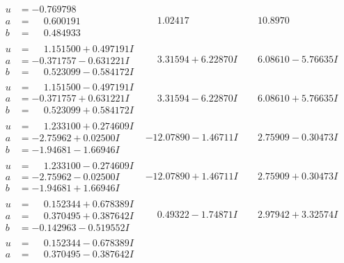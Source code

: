 \documentclass[1p]{elsarticle_modified}
\theoremstyle{definition}
\begin{document}
$$\begin{array}{c|c|c}
\begin{aligned}
u &= -0.769798\phantom{ +0.000000I} \\
a &= \phantom{-}0.600191\phantom{ +0.000000I} \\
b &= \phantom{-}0.484933\phantom{ +0.000000I}\end{aligned}
 & \phantom{-}1.02417\phantom{ +0.000000I} & \phantom{-}10.8970\phantom{ +0.000000I} \\ \hline\begin{aligned}
u &= \phantom{-}1.151500 + 0.497191 I \\
a &= -0.371757 - 0.631221 I \\
b &= \phantom{-}0.523099 - 0.584172 I\end{aligned}
 & \phantom{-}3.31594 + 6.22870 I & \phantom{-}6.08610 - 5.76635 I \\ \hline\begin{aligned}
u &= \phantom{-}1.151500 - 0.497191 I \\
a &= -0.371757 + 0.631221 I \\
b &= \phantom{-}0.523099 + 0.584172 I\end{aligned}
 & \phantom{-}3.31594 - 6.22870 I & \phantom{-}6.08610 + 5.76635 I \\ \hline\begin{aligned}
u &= \phantom{-}1.233100 + 0.274609 I \\
a &= -2.75962 + 0.02500 I \\
b &= -1.94681 - 1.66946 I\end{aligned}
 & -12.07890 - 1.46711 I & \phantom{-}2.75909 - 0.30473 I \\ \hline\begin{aligned}
u &= \phantom{-}1.233100 - 0.274609 I \\
a &= -2.75962 - 0.02500 I \\
b &= -1.94681 + 1.66946 I\end{aligned}
 & -12.07890 + 1.46711 I & \phantom{-}2.75909 + 0.30473 I \\ \hline\begin{aligned}
u &= \phantom{-}0.152344 + 0.678389 I \\
a &= \phantom{-}0.370495 + 0.387642 I \\
b &= -0.142963 - 0.519552 I\end{aligned}
 & \phantom{-}0.49322 - 1.74871 I & \phantom{-}2.97942 + 3.32574 I \\ \hline\begin{aligned}
u &= \phantom{-}0.152344 - 0.678389 I \\
a &= \phantom{-}0.370495 - 0.387642 I \\

\end{aligned}
\end{array}$$
\end{document}
